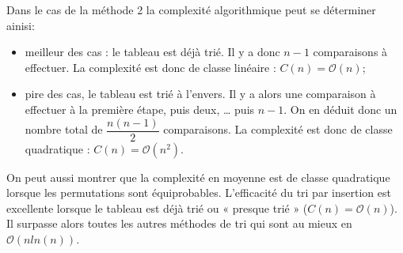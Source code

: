 \documentclass[10pt,fleqn]{article} %
\begin{document}


Dans le cas de la méthode 2 la complexité algorithmique peut se déterminer ainisi: 
\begin{itemize}
\item meilleur des cas : le tableau est déjà trié. Il y a donc $n - 1$ comparaisons à effectuer. La complexité est donc de classe linéaire : $C(n)=\mathcal{O}(n)$;
\item pire des cas, le tableau est trié à l'envers. Il y a alors une comparaison à effectuer à la première étape, puis deux, … puis $n-1$. On en déduit donc un nombre total de $\dfrac{n\left(n-1\right)}{2}$  comparaisons. La complexité est donc de classe quadratique : $C(n)=\mathcal{O}\left(n^2\right)$.

\end{itemize}



\begin{rem}
On peut aussi montrer que la complexité en moyenne est de classe quadratique lorsque les permutations sont équiprobables. L'efficacité du tri par insertion est excellente lorsque le tableau est déjà trié ou « presque trié » ($C(n)=\mathcal{O}\left(n\right)$). Il surpasse alors toutes les autres méthodes de tri qui sont au mieux en $\mathcal{O}\left(n ln(n)\right)$.
\end{rem}





\end{document}
